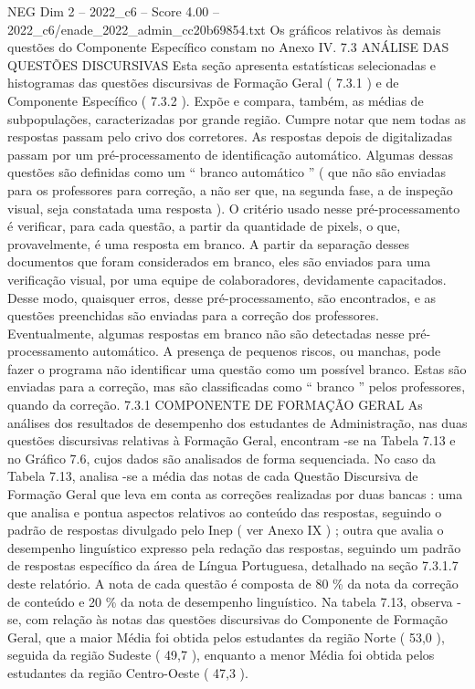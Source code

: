 \begin{textsample}{NEG Dim 2 – 2022\_c6 – Score 4.00 – 2022\_c6/enade\_2022\_admin\_cc20b69854.txt}
Os gráficos relativos às demais questões do Componente Específico constam no Anexo IV. 7.3 ANÁLISE DAS QUESTÕES DISCURSIVAS Esta seção apresenta estatísticas selecionadas e histogramas das questões discursivas de Formação Geral ( 7.3.1 ) e de Componente Específico ( 7.3.2 ).
Expõe e compara, também, as médias de subpopulações, caracterizadas por grande região.
Cumpre notar que nem todas as respostas passam pelo crivo dos corretores.
As respostas depois de digitalizadas passam por um pré-processamento de identificação automático.
Algumas dessas questões são definidas como um “ branco automático ” ( que não são enviadas para os professores para correção, a não ser que, na segunda fase, a de inspeção visual, seja constatada uma resposta ).
O critério usado nesse pré-processamento é verificar, para cada questão, a partir da quantidade de pixels, o que, provavelmente, é uma resposta em branco.
A partir da separação desses documentos que foram considerados em branco, eles são enviados para uma verificação visual, por uma equipe de colaboradores, devidamente capacitados.
Desse modo, quaisquer erros, desse pré-processamento, são encontrados, e as questões preenchidas são enviadas para a correção dos professores.
Eventualmente, algumas respostas em branco não são detectadas nesse pré-processamento automático.
A presença de pequenos riscos, ou manchas, pode fazer o programa não identificar uma questão como um possível branco.
Estas são enviadas para a correção, mas são classificadas como “ branco ” pelos professores, quando da correção. 7.3.1 COMPONENTE DE FORMAÇÃO GERAL As análises dos resultados de desempenho dos estudantes de Administração, nas duas questões discursivas relativas à Formação Geral, encontram -se na Tabela 7.13 e no Gráfico 7.6, cujos dados são analisados de forma sequenciada.
No caso da Tabela 7.13, analisa -se a média das notas de cada Questão Discursiva de Formação Geral que leva em conta as correções realizadas por duas bancas : uma que analisa e pontua aspectos relativos ao conteúdo das respostas, seguindo o padrão de respostas divulgado pelo Inep ( ver Anexo IX ) ; outra que avalia o desempenho linguístico expresso pela redação das respostas, seguindo um padrão de respostas específico da área de Língua Portuguesa, detalhado na seção 7.3.1.7 deste relatório.
A nota de cada questão é composta de 80 \% da nota da correção de conteúdo e 20 \% da nota de desempenho linguístico.
Na tabela 7.13, observa -se, com relação às notas das questões discursivas do Componente de Formação Geral, que a maior Média foi obtida pelos estudantes da região Norte ( 53,0 ), seguida da região Sudeste ( 49,7 ), enquanto a menor Média foi obtida pelos estudantes da região Centro-Oeste ( 47,3 ).

\end{textsample}
